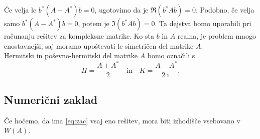 \documentclass[12pt,a4paper]{amsart}\usepackage[slovene]{babel}%
\theoremstyle{definition}\newtheorem{definicija}{Definicija}[section]\newtheorem{primer}[definicija]{Primer}\newtheorem{opomba}[definicija]{Opomba}
\theoremstyle{plain}\newtheorem{lema}[definicija]{Lema}\newtheorem{izrek}[definicija]{Izrek}\newtheorem{trditev}[definicija]{Trditev}\newtheorem{posledica}[definicija]{Posledica}
\begin{document}
{Če velja le $b^\ast (A+A^\ast)b=0$, ugotovimo da je $\Re(b^\ast Ab)=0$. Podobno, če velja samo $b^\ast(A-A^\ast)b=0$, potem je $\Im(b^\ast Ab)=0$. Ta dejstva bomo uporabili pri računanju rešitev za kompleksne matrike. Ko sta $b$ in $A$ realna, je problem mnogo enostavnejši, saj moramo upoštevati le simetričen del matrike $A$.\\Hermitski in poševno-hermitski del matrike $A$ bomo označili s $$H=\frac{A+A^\ast}{2}\quad \text{in} \quad K=\frac{A-A^\ast}{2\imath}.$$
\subsection{Numerični zaklad}%
Če hočemo, da ima \eqref{eq:zac} vsaj eno rešitev, mora biti izhodišče vsebovano v $W(A)$. \\
}
\end{document}
